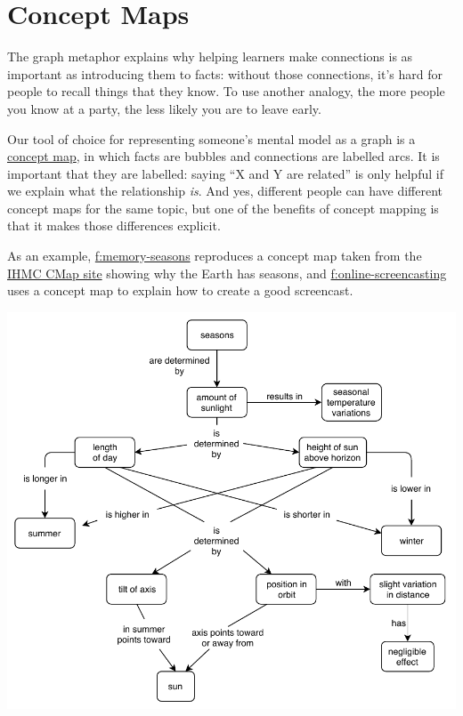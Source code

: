 \section{Concept Maps}\label{s:memory-concept-maps}

The graph metaphor explains why helping learners make connections is as
important as introducing them to facts: without those connections, it's
hard for people to recall things that they know. To use another analogy,
the more people you know at a party, the less likely you are to leave
early.

Our tool of choice for representing someone's mental model as a graph is
a \protect\hyperlink{g:concept-map}{concept map}, in which facts are bubbles
and connections are labelled arcs. It is important that they are
labelled: saying ``X and Y are related'' is only helpful if we explain
what the relationship \emph{is}. And yes, different people can have different
concept maps for the same topic, but one of the benefits of concept
mapping is that it makes those differences explicit.

As an example, \protect\hyperlink{FIGURE}{f:memory-seasons} reproduces a concept map
taken from the \href{https://cmap.ihmc.us/}{IHMC CMap site} showing why the
Earth has seasons, and \protect\hyperlink{FIGURE}{f:online-screencasting} uses a concept
map to explain how to create a good screencast.

\includegraphics{../../files/seasons.pdf}

